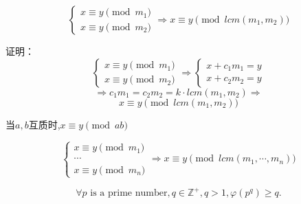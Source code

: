 \begin{lemma}\label{EEL1}
	\begin{displaymath}
		\left\{
		\begin{array}{l}
			x\equiv y \pmod{m_1} \\
			x\equiv y \pmod{m_2}
		\end{array}
		\right.
		\Rightarrow x\equiv y \pmod{lcm(m_1,m_2)}
	\end{displaymath}
\end{lemma}

证明：
\begin{displaymath}
	\left\{
	\begin{array}{l}
		x\equiv y \pmod{m_1} \\
		x\equiv y \pmod{m_2}
	\end{array}
	\right.
	\Rightarrow
	\left\{
	\begin{array}{l}
		x+c_1m_1=y \\
		x+c_2m_2=y
	\end{array}
	\right.
\end{displaymath}
\begin{displaymath}
	\Rightarrow
	c_1m_1=c_2m_2=k\cdot lcm(m_1,m_2)
	\Rightarrow
\end{displaymath}
\begin{displaymath}
	x \equiv y \pmod{lcm(m_1,m_2)}
\end{displaymath}

\begin{inference}\label{EEL1I}
	当$a,b$互质时,$x\equiv y \pmod{ab}$
\end{inference}

\begin{inference}
	\begin{displaymath}
		\left\{
		\begin{array}{l}
			x\equiv y \pmod{m_1} \\
			\cdots               \\
			x\equiv y \pmod{m_n}
		\end{array}
		\right.
		\Rightarrow x\equiv y \pmod{lcm(m_1,\cdots,m_n)}
	\end{displaymath}
\end{inference}

\begin{lemma}\label{EEL2}
	\begin{displaymath}
		\forall p\textrm{ is a prime number},q\in \mathbb{Z^+},q>1,
		\varphi(p^q)\geq q.
	\end{displaymath}
\end{lemma}

